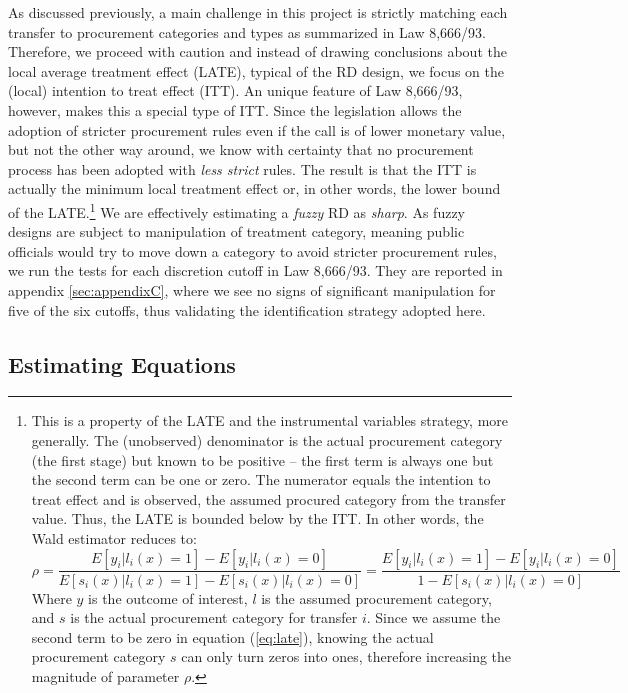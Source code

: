 \documentclass[11pt]{article}
\begin{document}
As discussed previously, a main challenge in this project is strictly matching each transfer to procurement categories and types as summarized in Law 8,666/93. Therefore, we proceed with caution and instead of drawing conclusions about the local average treatment effect (LATE), typical of the RD design, we focus on the (local) intention to treat effect (ITT). An unique feature of Law 8,666/93, however, makes this a special type of ITT. Since the legislation allows the adoption of stricter procurement rules even if the call is of lower monetary value, but not the other way around, we know with certainty that no procurement process has been adopted with \emph{less strict} rules. The result is that the ITT is actually the minimum local treatment effect or, in other words, the lower bound of the LATE.\footnote{This is a property of the LATE and the instrumental variables strategy, more generally. The (unobserved) denominator is the actual procurement category (the first stage) but known to be positive -- the first term is always one but the second term can be one or zero. The numerator equals the intention to treat effect and is observed, the assumed procured category from the transfer value. Thus, the LATE is bounded below by the ITT. In other words, the Wald estimator reduces to:
\begin{equation} \label{eq:late}
  \rho = \frac{E[y_{i}|l_{i}(x)=1]-E[y_{i}|l_{i}(x)=0]}{E[s_{i}(x)|l_{i}(x)=1]-E[s_{i}(x)|l_{i}(x)=0]} = \frac{E[y_{i}|l_{i}(x)=1]-E[y_{i}|l_{i}(x)=0]}{1-E[s_{i}(x)|l_{i}(x)=0]}
\end{equation}
Where $y$ is the outcome of interest, $l$ is the assumed procurement category, and $s$ is the actual procurement category for transfer $i$. Since we assume the second term to be zero in equation (\ref{eq:late}), knowing the actual procurement category $s$ can only turn zeros into ones, therefore increasing the magnitude of parameter $\rho$.} We are effectively estimating a \emph{fuzzy} RD as \emph{sharp}. As fuzzy designs are subject to manipulation of treatment category, meaning public officials would try to move down a category to avoid stricter procurement rules, we run the \citet{McCraryManipulationrunningvariable2008} tests for each discretion cutoff in Law 8,666/93. They are reported in appendix \ref{sec:appendixC}, where we see no signs of significant manipulation for five of the six cutoffs, thus validating the identification strategy adopted here.

\subsection{Estimating Equations} \label{subsec:equations}
\end{document}
